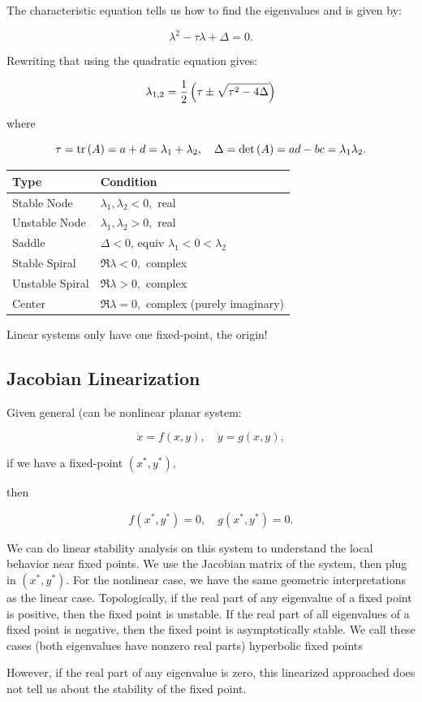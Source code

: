 \documentclass{article}
\begin{document}
\begin{definition}
The characteristic equation tells us how to find the \@{eigenvalues} and is given by:

\[ \lambda^2 - \tau \lambda + \Delta = 0. \]
\end{definition}

Rewriting that using the quadratic equation gives:

\[ \lambda_{1,2} = \frac{1}{2} \left(\tau \pm \sqrt{\tau^2 - 4 \Delta}\right) \]

where

\[ \tau = \operatorname{tr}{(A)} = a + d = \lambda_1 + \lambda_2, \quad \Delta = \det{(A)} = ad - bc = \lambda_1 \lambda_2. \]

\begin{tabular}{ll}
Type & Condition \\
\hline
Stable Node & $\lambda_1,\lambda_2 < 0,$ real \\
Unstable Node & $\lambda_1, \lambda_2 > 0,$ real \\
Saddle & $\Delta < 0$, equiv $\lambda_1 < 0 < \lambda_2$ \\
Stable Spiral & $\Re{\lambda} < 0,$ complex \\
Unstable Spiral & $\Re{\lambda} > 0,$ complex \\
Center & $\Re{\lambda} = 0,$ complex (purely imaginary) \\
\end{tabular}

Linear systems only have one \@{fixed-point}, the origin!

\subsection{Jacobian Linearization}

Given general (can be nonlinear planar system:

\[ \dot{x} = f(x,y), \quad \dot{y} = g(x,y), \]

if we have a \@{fixed-point} $(x^*, y^*),$

then

\[ f(x^*, y^*) = 0, \quad g(x^*, y^*) = 0. \]

We can do linear stability analysis on this system to understand the local behavior near fixed points. We use the \@{Jacobian} matrix of the system, then plug in $(x^*, y^*).$ For the nonlinear case, we have the same geometric interpretations as the linear case. Topologically, if the real part of any eigenvalue of a fixed point is positive, then the fixed point is \@{unstable}. If the real part of all eigenvalues of a fixed point is negative, then the fixed point is asymptotically stable. We call these cases (both eigenvalues have nonzero real parts) hyperbolic \@{fixed} points

However, if the real part of any eigenvalue is zero, this linearized approached does not tell us about the stability of the fixed point.
\end{document}
